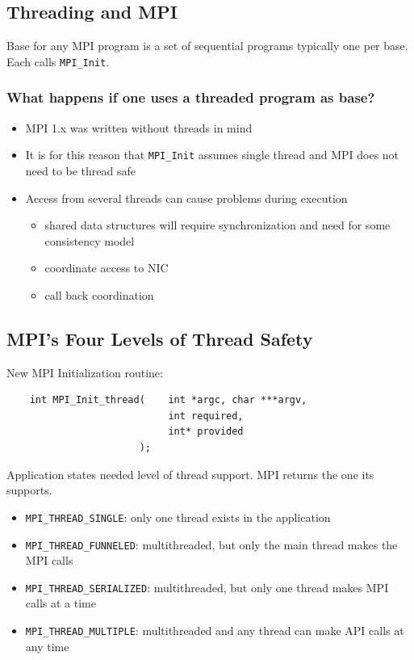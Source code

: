 \documentclass[12pt, a4paper]{report}
\begin{document}
\subsection{Threading and MPI}
Base for any MPI program is a set of sequential programs typically one per base. Each calls \verb$MPI_Init$.

\subsubsection{What happens if one uses a threaded program as base?}
\begin{itemize}
    \item MPI 1.x was written without threads in mind
    \item It is for this reason that \verb$MPI_Init$ assumes single thread and MPI does not need to be thread safe
    \item Access from several threads can cause problems during execution
    \begin{itemize}
        \item shared data structures will require synchronization and need for some consistency model
        \item coordinate access to NIC
        \item call back coordination
    \end{itemize}
\end{itemize}

\subsection{MPI's Four Levels of Thread Safety}
New MPI Initialization routine:
\begin{verbatim}
    int MPI_Init_thread(    int *argc, char ***argv,
                            int required,
                            int* provided
                       );
\end{verbatim}
Application states needed level of thread support. MPI returns the one its supports.

\begin{itemize}
    \item \verb$MPI_THREAD_SINGLE$: only one thread exists in the application
    \item \verb$MPI_THREAD_FUNNELED$: multithreaded, but only the main thread makes the MPI calls
    \item \verb$MPI_THREAD_SERIALIZED$: multithreaded, but only one thread makes MPI calls at a time
    \item \verb$MPI_THREAD_MULTIPLE$: multithreaded and any thread can make API calls at any time
\end{itemize}
\end{document}
